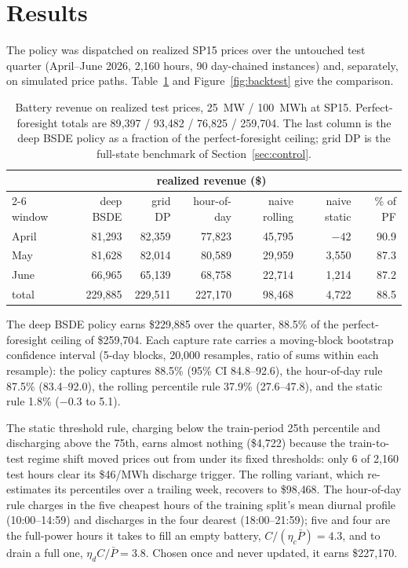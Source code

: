 \documentclass[11pt]{article}
\begin{document}
\section{Results}
\label{sec:results}

The policy was dispatched on realized SP15 prices over the untouched test
quarter (April--June 2026, 2{,}160 hours, 90 day-chained instances) and,
separately, on simulated price paths. Table~\ref{tab:backtest} and
Figure~\ref{fig:backtest} give the comparison.

\begin{table}[tbp]
\centering\small
\begin{tabular}{lrrrrrr}
\toprule
 & \multicolumn{5}{c}{realized revenue (\$)} & \\
\cmidrule(lr){2-6}
window & deep BSDE & grid DP & hour-of-day & naive rolling & naive static
& \% of PF\\
\midrule
April & 81{,}293 & 82{,}359 & 77{,}823 & 45{,}795 & $-42$ & 90.9\\
May & 81{,}628 & 82{,}014 & 80{,}589 & 29{,}959 & 3{,}550 & 87.3\\
June & 66{,}965 & 65{,}139 & 68{,}758 & 22{,}714 & 1{,}214 & 87.2\\
\midrule
total & 229{,}885 & 229{,}511 & 227{,}170 & 98{,}468 & 4{,}722 &
88.5\\
\bottomrule
\end{tabular}
\caption{Battery revenue on realized test prices, 25~MW / 100~MWh at SP15.
Perfect-foresight totals are 89{,}397 / 93{,}482 / 76{,}825 / 259{,}704.
The last column is the deep BSDE policy as a fraction of the
perfect-foresight ceiling; grid DP is the full-state benchmark of
Section~\ref{sec:control}.}
\label{tab:backtest}
\end{table}

The deep BSDE policy earns \$229{,}885 over the quarter, 88.5\% of the
perfect-foresight ceiling of \$259{,}704. Each capture rate carries a
moving-block bootstrap confidence interval (5-day blocks, 20{,}000
resamples, ratio of sums within each resample): the policy captures
88.5\% (95\% CI 84.8--92.6), the hour-of-day rule 87.5\% (83.4--92.0),
the rolling percentile rule 37.9\% (27.6--47.8), and the static rule
1.8\% ($-0.3$ to 5.1).

The static threshold rule, charging below the train-period 25th
percentile and discharging above the 75th, earns almost nothing
(\$4{,}722) because the train-to-test regime shift moved prices out from
under its fixed thresholds: only 6 of 2{,}160 test hours clear its
\$46/MWh discharge trigger. The rolling variant, which re-estimates its
percentiles over a trailing week, recovers to \$98{,}468. The hour-of-day
rule charges in the five cheapest hours of the training split's mean
diurnal profile (10:00--14:59) and discharges in the four dearest
(18:00--21:59); five and four are the full-power hours it takes to fill
an empty battery, $C/(\eta_c \bar P) = 4.3$, and to drain a full one,
$\eta_d C/\bar P = 3.8$. Chosen once and never updated, it earns
\$227{,}170.
\end{document}
